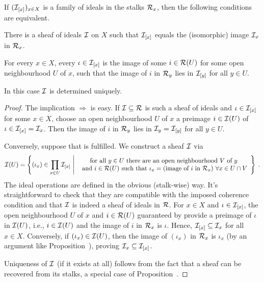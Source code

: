 \documentclass[a4paper,parskip=half,numbers=enddot, DIV=12]{scrreprt}
\begin{document}
\begin{prop}
    If $(\mathcal{I}_{[x]})_{x\in X}$ is a family of ideals in the stalks $\mathcal{R}_x$, then the following conditions are equivalent.
    \begin{alphanumerate}
        \item 
            There is a sheaf of ideals $\mathcal{I}$ on $X$ such that $\mathcal{I}_{[x]}$ equals the (isomorphic) image $\mathcal{I}_x$ in $\mathcal{R}_x$.
        \item  
            For every $x\in X$, every $\iota\in \mathcal{I}_{[x]}$ is the image of some $i\in\mathcal{R}(U)$ for some open neighbourhood $U$ of $x$, such that the image of $i$ in $\mathcal{R}_y$ lies in $\mathcal{I}_{[y]}$ for all $y\in U$.
    \end{alphanumerate}
    In this case $\mathcal{I}$ is determined uniquely.
\end{prop}
	\begin{proof}
		The implication  $\Rightarrow$  is easy. If $\mathcal{I}\subseteq\mathcal{R}$ is such a sheaf of ideals and $\iota\in\mathcal{I}_{[x]}$ for some $x\in X$, choose an open neighbourhood $U$ of $x$ a preimage $i\in\mathcal{I}(U)$ of $\iota\in\mathcal{I}_{[x]}=\mathcal{I}_x$. Then the image of $i$ in $\mathcal{R}_y$ lies in $\mathcal{I}_y=\mathcal{I}_{[y]}$ for all $y\in U$.
		
		Conversely, suppose that  is fulfilled. We construct a sheaf $\mathcal{I}$ via
		\begin{align*}
			\mathcal{I}(U)=\left\{(\iota_x)\in\prod_{x\in U}\mathcal{I}_{[x]}\ \middle|\ 
			\begin{array}{c}
			\text{for all }y\in U\text{ there are an open neighbourhood }V\text{ of }y\\
			\text{ and }i\in\mathcal{R}(U)\text{ such that }\iota_x=(\text{image of }i\text{ in }\mathcal{R}_x)\ \forall x\in U\cap V
			\end{array}\right\}\;.
		\end{align*}
		The ideal operations are defined in the obvious (stalk-wise) way. It's straightforward to check that they are compatible with the imposed coherence condition and that $\mathcal{I}$ is indeed a sheaf of ideals in $\mathcal{R}$. For $x\in X$ and $\iota\in\mathcal{I}_{[x]}$, the open neighbourhood $U$ of $x$ and $i\in\mathcal{R}(U)$ guaranteed by  provide a preimage of $\iota$ in $\mathcal{I}(U)$, i.e., $i\in\mathcal{I}(U)$ and the image of $i$ in $\mathcal{R}_x$ is $\iota$. Hence, $\mathcal{I}_{[x]}\subseteq\mathcal{I}_x$ for all $x\in X$. Conversely, if $(\iota_x)\in\mathcal{I}(U)$, then the image of $(\iota_x)$ in $\mathcal{R}_x$ is $\iota_x$ (by an argument like Proposition~), proving $\mathcal{I}_x\subseteq\mathcal{I}_{[x]}$.
		
		Uniqueness of $\mathcal{I}$ (if it exists at all) follows from the fact that a sheaf can be recovered from its stalks, a special case of Proposition~.
	\end{proof}
\end{document}
